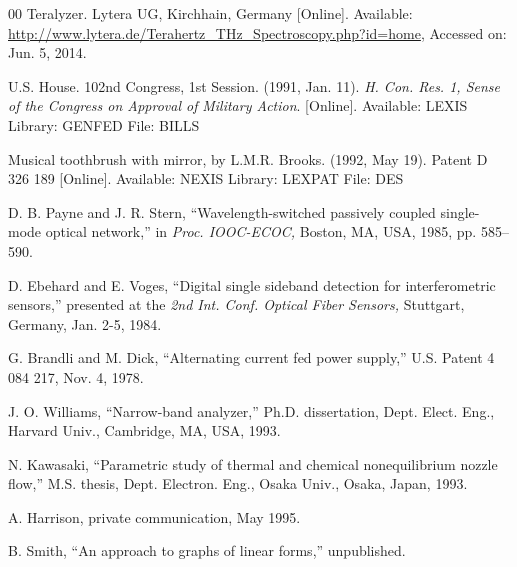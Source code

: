 \documentclass{ieeeaccess}
\begin{document}
\begin{thebibliography}{00}
 Teralyzer. Lytera UG, Kirchhain, Germany [Online]. Available: \underline{http://www.lytera.de/Terahertz\_THz\_Spectroscopy.php?id=home}, Accessed on: Jun. 5, 2014.

 U.S. House. 102nd Congress, 1st Session. (1991, Jan. 11). \emph{H. Con. Res. 1, Sense of the Congress on Approval of}  \emph{Military Action}. [Online]. Available: LEXIS Library: GENFED File: BILLS

 Musical toothbrush with mirror, by L.M.R. Brooks. (1992, May 19). Patent D 326 189 [Online]. Available: NEXIS Library: LEXPAT File: DES

 D. B. Payne and J. R. Stern, ``Wavelength-switched passively coupled single-mode optical network,'' in \emph{Proc. IOOC-ECOC,} Boston, MA, USA, 1985, pp. 585--590.

 D. Ebehard and E. Voges, ``Digital single sideband detection for interferometric sensors,'' presented at the \emph{2nd Int. Conf. Optical Fiber Sensors,} Stuttgart, Germany, Jan. 2-5, 1984.

 G. Brandli and M. Dick, ``Alternating current fed power supply,'' U.S. Patent 4 084 217, Nov. 4, 1978.

 J. O. Williams, ``Narrow-band analyzer,'' Ph.D. dissertation, Dept. Elect. Eng., Harvard Univ., Cambridge, MA, USA, 1993.

 N. Kawasaki, ``Parametric study of thermal and chemical nonequilibrium nozzle flow,'' M.S. thesis, Dept. Electron. Eng., Osaka Univ., Osaka, Japan, 1993.

 A. Harrison, private communication, May 1995.

 B. Smith, ``An approach to graphs of linear forms,'' unpublished.

\end{thebibliography}
\end{document}
